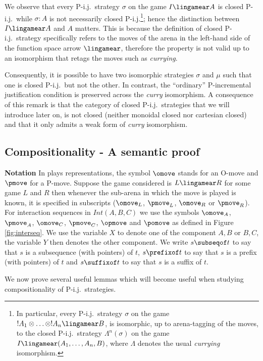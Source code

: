 We observe that every P-i.j.\ strategy $\sigma$ on the game $I
\lingamear A$ is closed P-i.j.\ while $\sigma : A$ is not
necessarily closed P-i.j.\footnote{In particular, every P-i.j.\
strategy $\sigma$ on the game $!A_1 \otimes \ldots \otimes !A_n
\lingamear B$, is isomorphic, up to arena-tagging of the moves, to
the closed P-i.j.\ strategy $\Lambda^n(\sigma)$ on the game $I
\lingamear (A_1,\ldots,A_n,B)$, where $\Lambda$ denotes the usual
{\it currying} isomorphism.}; hence the distinction between $I
\lingamear A$ and $A$ matters. This is because the definition of
closed P-i.j.\ strategy specifically refers to the moves of  the
arena in the left-hand side of the function space arrow
$\lingamear$, therefore the property is not valid up to an
isomorphism that retags the moves such as {\it currying}.

Consequently, it is possible to have two isomorphic strategies $\sigma$ and
$\mu$ such that one is closed P-i.j.\ but not the other. In contrast, the ``ordinary'' P-incremental
justification condition is preserved across the  {\it curry} isomorphism. A consequence of this remark is that the category of closed P-i.j.\ strategies
that we will introduce later on, is not closed (neither monoidal closed nor cartesian closed) and
that it only admits a weak form of {\it curry} isomorphism.

\subsection{Compositionality - A semantic proof}

{\bf Notation} In plays representations, the symbol $\omove$ stands
for an O-move and $\pmove$ for a P-move. Suppose the game considered
is $L\lingamear R$ for some game $L$ and $R$ then whenever the
sub-arena in which the move is played is known, it is specified in
subscripts ($\omove_L$, $\pmove_L$, $\omove_R$ or $\pmove_R$). For
interaction sequences in $Int(A,B,C)$ we use the symbols $\omove_A$,
$\pmove_A$, $\omove_C$, $\pmove_C$, $\opmove$ and $\pomove$ as
defined in Figure \ref{fig:interseq}. We use the variable $X$ to
denote one of the component $A,B$ or $B,C$, the variable  $Y$ then
denotes the other component. We write $s \subseqof t$ to say that
$s$ is a subsequence (with pointers) of $t$, $s \prefixof t$ to say
that $s$ is a prefix (with pointers) of $t$ and  $s \suffixof t$ to
say that $s$ is a suffix of $t$.

We now prove several useful lemmas which will become useful when studying compositionality of P-i.j.\ strategies.

